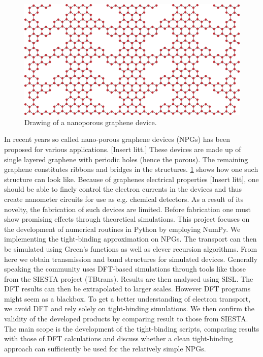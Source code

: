 \begin{figure}
\vspace{-1em}
	\centering
	\includegraphics[width=.4\textwidth]{Figures/NPGintroGraphic.eps}
    \caption{Drawing of a nanoporous graphene device.}\label{introGraphic}
\end{figure}
In recent years so called nano-porous graphene devices (NPGs) has been proposed for various applications. [Insert litt.] These devices are made up of single layered graphene with periodic holes (hence the porous). The remaining graphene constitutes ribbons and bridges in the structures. \cref{introGraphic} shows how one such structure can look like.
Because of graphenes electrical properties [Insert litt], one should be able to finely control the electron currents in the devices and thus create nanometer circuits for use as e.g. chemical detectors. As a result of its novelty, the fabrication of such devices are limited. Before fabrication one must show promising effects through theoretical simulations.\newline
This project focuses on the development of numerical routines in Python by employing NumPy. We implementing the tight-binding approximation on NPGs. The transport can then be simulated using Green's functions as well as clever recursion algorithms. From here we obtain transmission and band structures for simulated devices.\newline
Generally speaking the community uses DFT-based simulations through tools like those from the SIESTA project (TBtrans). Results are then analysed using SISL\cite{zerothi_sisl}. The DFT results can then be extrapolated to larger scales\cite{calogero_electron_2019}. However DFT programs might seem as a blackbox. To get a better understanding of electron transport, we avoid DFT and rely solely on tight-binding simulations. We then confirm the validity of the developed products by comparing result to those from SIESTA.\newline
The main scope is the development of the tight-binding scripts, comparing results with those of DFT calculations and discuss whether a clean tight-binding approach can sufficiently be used for the relatively simple NPGs.\newline
